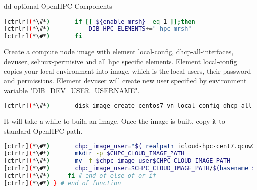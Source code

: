 	dd optional OpenHPC Components


\begin{lstlisting}[language=bash,keywords={}]
[ctrlr](*\#*)       if [[ ${enable_mrsh} -eq 1 ]];then
[ctrlr](*\#*)           DIB_HPC_ELEMENTS+=" hpc-mrsh"
[ctrlr](*\#*)       fi
\end{lstlisting} 

	Create a compute node image with element local-config, dhcp-all-interfaces, devuser, selinux-permisive and all hpc specific elements. Element local-config copies your local environment into image, which is the local users, their password and permissions. Element devuser will create new user specified by environment variable "DIB\_DEV\_USER\_USERNAME". 


\begin{lstlisting}[language=bash,keywords={}]
[ctrlr](*\#*)       disk-image-create centos7 vm local-config dhcp-all-interfaces devuser selinux-permissive $DIB_HPC_ELEMENTS -o icloud-hpc-cent7
\end{lstlisting} 


	It will take a while to build an image. Once the image is built, copy it to standard OpenHPC path.


\begin{lstlisting}[language=bash,keywords={}]
[ctrlr](*\#*)       chpc_image_user="$( realpath icloud-hpc-cent7.qcow2)"
[ctrlr](*\#*)       mkdir -p $CHPC_CLOUD_IMAGE_PATH
[ctrlr](*\#*)       mv -f $chpc_image_user$CHPC_CLOUD_IMAGE_PATH
[ctrlr](*\#*)       chpc_image_user=$CHPC_CLOUD_IMAGE_PATH/$(basename $chpc_image_user)
[ctrlr](*\#*)     fi # end of else of or if
[ctrlr](*\#*) } # end of function
\end{lstlisting} 

